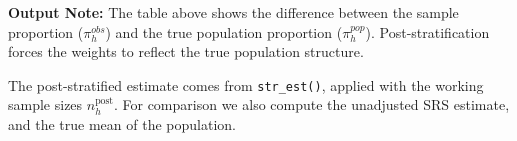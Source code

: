 \documentclass[
  letterpaper,
  DIV=11,
  numbers=noendperiod]{scrreprt}
\newenvironment{Shaded}{\begin{snugshade}}{\end{snugshade}}
\newcommand{\AttributeTok}[1]{\textcolor[rgb]{0.40,0.45,0.13}{#1}}
\newcommand{\DocumentationTok}[1]{\textcolor[rgb]{0.37,0.37,0.37}{\textit{#1}}}
\newcommand{\FunctionTok}[1]{\textcolor[rgb]{0.28,0.35,0.67}{#1}}
\newcommand{\NormalTok}[1]{\textcolor[rgb]{0.00,0.23,0.31}{#1}}
\newcommand{\OtherTok}[1]{\textcolor[rgb]{0.00,0.23,0.31}{#1}}
\newcommand{\SpecialCharTok}[1]{\textcolor[rgb]{0.37,0.37,0.37}{#1}}
\newcommand{\StringTok}[1]{\textcolor[rgb]{0.13,0.47,0.30}{#1}}
\renewcommand{\[}{\begin{equation}}
\renewcommand{\]}{\end{equation}}
\begin{document}
\begin{table}

\caption{\label{tbl-agsrs-poststrat-summary}Observed vs.~population
stratum proportions and post-stratified sample sizes}


\end{table}%

\textbf{Output Note:} The table above shows the difference between the
sample proportion (\(\pi^{obs}_h\)) and the true population proportion
(\(\pi^{pop}_h\)). Post-stratification forces the weights to reflect the
true population structure.

The post-stratified estimate comes from \texttt{str\_est()}, applied
with the working sample sizes \(n_h^{\text{post}}\). For comparison we
also compute the unadjusted SRS estimate, and the true mean of the
population.

\begin{Shaded}
\end{Shaded}
\end{document}
